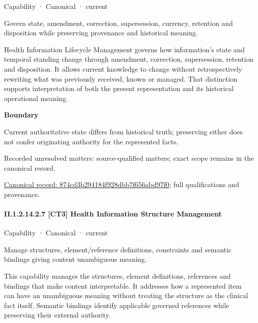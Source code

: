 \label{element:874cd3b294184f928dbb7f656abd97f0}
{\small Capability · Canonical · current}\par

Govern state, amendment, correction, supersession, currency, retention and disposition while preserving provenance and historical meaning.



Health Information Lifecycle Management governs how information's state and temporal standing change through amendment, correction, supersession, retention and disposition. It allows current knowledge to change without retrospectively rewriting what was previously received, known or managed. That distinction supports interpretation of both the present representation and its historical operational meaning.



\textbf{Boundary}



Current authoritative state differs from historical truth; preserving either does not confer originating authority for the represented facts.


{\small Recorded unresolved matters: source-qualified matters; exact scope remains in the canonical record.}\par
{\footnotesize \href{../../../../continuum/strategy/capability/874cd3b294184f928dbb7f656abd97f0.md}{Canonical record: 874cd3b294184f928dbb7f656abd97f0}; full qualifications and provenance.}\par
\paragraph*{II.1.2.14.2.7 [CT3] Health Information Structure Management}
\label{navigation:II.1.2.14.2.7}

\label{element:c3b3e39dd141448e96b7dd7b4c4516f2}
{\small Capability · Canonical · current}\par

Manage structures, element/reference definitions, constraints and semantic bindings giving content unambiguous meaning.



This capability manages the structures, element definitions, references and bindings that make content interpretable. It addresses how a represented item can have an unambiguous meaning without treating the structure as the clinical fact itself. Semantic bindings identify applicable governed references while preserving their external authority.



